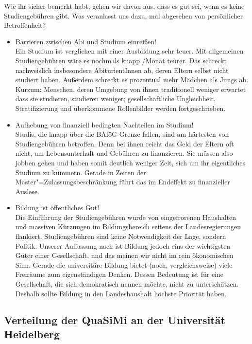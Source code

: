 Wie ihr sicher bemerkt habt, gehen wir davon aus, dass es gut sei, wenn es keine Studiengebühren gibt. Was veranlasst uns dazu, mal abgesehen von persönlicher Betroffenheit?
\begin{itemize}
\item {Barrieren zwischen Abi und Studium einreißen!}\\
	Ein Studium ist verglichen mit einer Ausbildung sehr teuer. Mit allgemeinen Studiengebühren wäre es nochmals knapp /Monat teurer. Das schreckt nachweislich insbesondere AbiturientInnen ab, deren Eltern selbst nicht studiert haben. Außerdem schreckt es prozentual mehr Mädchen als Jungs ab. Kurzum: Menschen, deren Umgebung von ihnen traditionell weniger erwartet dass sie studieren, studieren weniger; gesellschaftliche Ungleichheit, Stratifizierung und überkommene Rollenbilder werden fortgeschrieben.
\item {Aufhebung von finanziell bedingten Nachteilen im Studium!}\\
	Studis, die knapp über die BAföG-Grenze fallen, sind am härtesten von Studiengebühren betroffen. Denn bei ihnen reicht das Geld der Eltern oft nicht, um Lebensunterhalt und Gebühren zu finanzieren. Sie müssen also jobben gehen und haben somit deutlich weniger Zeit, sich um ihr eigentliches Studium zu kümmern. Gerade in Zeiten der Master"=Zulassungsbeschränkung führt das im Endeffekt zu finanzieller Auslese.
\item {Bildung ist öffentliches Gut!}\\
	Die Einführung der Studiengebühren wurde von eingefrorenen Haushalten und massiven Kürzungen im Bildungsbereich seitens der Landesregierungen flankiert. Studiengebühren sind keine Notwendigkeit der Lage, sondern Politik. Unserer Auffassung nach ist Bildung jedoch eins der wichtigsten Güter einer Gesellschaft, und das meinen wir nicht im rein ökonomischen Sinn. Gerade die universitäre Bildung bietet (noch, vergleichsweise) viele Freiräume zum eigenständigen Denken. Dessen Bedeutung ist für eine Gesellschaft, die sich demokratisch nennen möchte, nicht zu unterschätzen. Deshalb sollte Bildung in den Landeshaushalt höchste Priorität haben.
\end{itemize}

\subsection*{Verteilung der QuaSiMi an der Universität Heidelberg}

